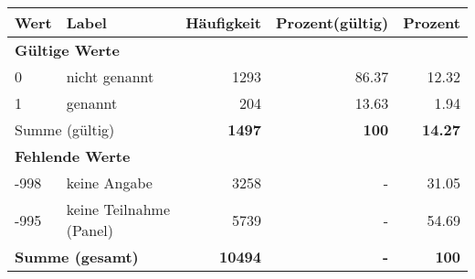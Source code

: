      \begin{longtable}{lXrrr}
     \toprule
     \textbf{Wert} & \textbf{Label} & \textbf{Häufigkeit} & \textbf{Prozent(gültig)} & \textbf{Prozent} \\
     \endhead
     \midrule
     \multicolumn{5}{l}{\textbf{Gültige Werte}}\\

     0 &
     \multicolumn{1}{X}{ nicht genannt   } &


       \num{1293} &
       \num[round-mode=places,round-precision=2]{86,37} &
         \num[round-mode=places,round-precision=2]{12,32} \\

     1 &
     \multicolumn{1}{X}{ genannt   } &


       \num{204} &
       \num[round-mode=places,round-precision=2]{13,63} &
         \num[round-mode=places,round-precision=2]{1,94} \\
     \midrule
     \multicolumn{2}{l}{Summe (gültig)} &
       \textbf{\num{1497}} &
     \textbf{100} &
       \textbf{\num[round-mode=places,round-precision=2]{14,27}} \\
     \multicolumn{5}{l}{\textbf{Fehlende Werte}}\\
       -998 &
       keine Angabe &
         \num{3258} &
        - &
         \num[round-mode=places,round-precision=2]{31,05} \\
       -995 &
       keine Teilnahme (Panel) &
         \num{5739} &
        - &
         \num[round-mode=places,round-precision=2]{54,69} \\
     \midrule
     \multicolumn{2}{l}{\textbf{Summe (gesamt)}} &
          \textbf{\num{10494}} &
        \textbf{-} &
        \textbf{100} \\
     \bottomrule
     \end{longtable}
     
